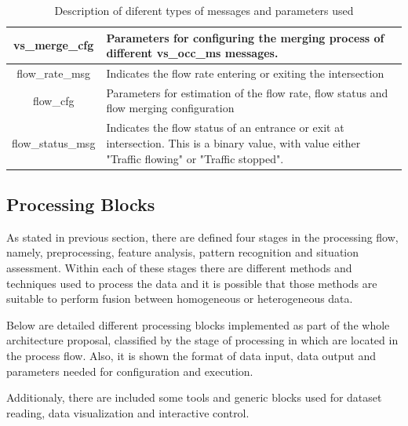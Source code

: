 \begin{table}[ht!]
\begin{tabular}{|c | p{8cm}|}
vs\_merge\_cfg & Parameters for configuring the merging process of different vs\_occ\_ms messages.\\
\hline

flow\_rate\_msg & Indicates the flow rate entering or exiting the intersection\\
\hline

flow\_cfg & Parameters for estimation of the flow rate, flow status and flow merging configuration\\
\hline

flow\_status\_msg & Indicates the flow status of an entrance or exit at intersection. This is a binary value, with value either "Traffic flowing" or "Traffic stopped".\\
\hline


\end{tabular}
\caption{Description of diferent types of messages and parameters used}
\label{desc_map}
\end{table}



\subsection{Processing Blocks} \label{proc_blocks}

As stated in previous section, there are defined four stages in the processing flow, namely, preprocessing, feature analysis, pattern recognition and situation assessment. Within each of these stages there are different methods and techniques used to process the data and it is possible that those methods are suitable to perform fusion between homogeneous or heterogeneous data.

Below are detailed different processing blocks implemented as part of the whole architecture proposal, classified by the stage of processing in which are located in the process flow. Also, it is shown the format of data input, data output and parameters needed for configuration and execution.

Additionaly, there are included some tools and generic blocks used for dataset reading, data visualization and interactive control.

